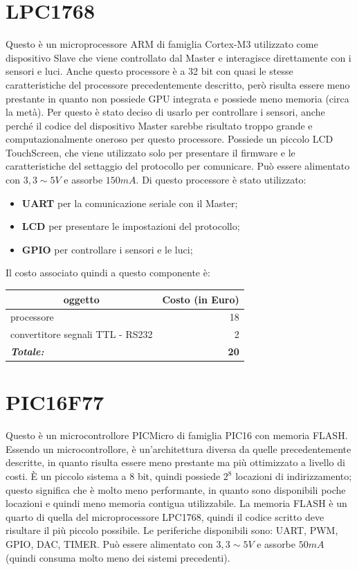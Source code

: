 \documentclass[a4paper,titlepage]{book}
\newcommand{\itema}{\begin{itemize}[noitemsep,topsep=10pt,parsep=5pt,partopsep=10pt]}
\begin{document}
\section{LPC1768}



Questo è un microprocessore ARM di famiglia Cortex-M3 utilizzato come dispositivo Slave che viene controllato dal Master e interagisce direttamente con i sensori e luci. Anche questo processore è a 32 bit con quasi le stesse caratteristiche del processore precedentemente descritto, però risulta essere meno prestante in quanto non possiede GPU integrata e possiede meno memoria (circa la metà). Per questo è stato deciso di usarlo per controllare i sensori, anche perché il codice del dispositivo Master sarebbe risultato troppo grande e computazionalmente oneroso per questo processore. Possiede un piccolo LCD TouchScreen, che viene utilizzato solo per presentare il firmware e le caratteristiche del settaggio del protocollo per comunicare. Può essere alimentato con $3,3 \sim 5 V$ e assorbe $150 mA$. Di questo processore è stato utilizzato:

\itema

\item \textbf{UART} per la comunicazione seriale con il Master;
\item \textbf{LCD} per presentare le impostazioni del protocollo;
\item \textbf{GPIO} per controllare i sensori e le luci;
\end{itemize}

Il costo associato quindi a questo componente è:

\begin{tabular}{|l  r|}
\hline
\multicolumn{1}{|c|}{\textbf {oggetto}} & \multicolumn{1}{c|}{\textbf {Costo (in Euro)}} \\
\hline

processore 				& 18 \\
convertitore segnali TTL - RS232 	&  2  \\
\hline
\hline

\textit{\textbf{Totale:}}		& \textbf{20} \\

\hline
\end{tabular}

\section{PIC16F77}


Questo è un microcontrollore PICMicro di famiglia PIC16 con memoria FLASH. Essendo un microcontrollore, è un'architettura diversa da quelle precedentemente descritte, in quanto risulta essere meno prestante ma più ottimizzato a livello di costi. È un piccolo sistema a 8 bit, quindi possiede $2^8$ locazioni di indirizzamento; questo significa che è molto meno performante, in quanto sono disponibili poche locazioni e quindi meno memoria contigua utilizzabile. La memoria FLASH è un quarto di quella del microprocessore LPC1768, quindi il codice scritto deve risultare il più piccolo possibile. Le periferiche disponibili sono: UART, PWM, GPIO, DAC, TIMER. Può essere alimentato con $3,3 \sim 5 V$ e assorbe $50 mA$ (quindi consuma molto meno dei sistemi precedenti).
\end{document}
